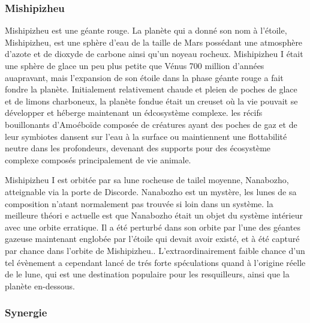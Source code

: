 \subsubsection{Mishipizheu} \label{sec:mishipizheu} 

Mishipizheu est une géante rouge. La planète qui a donné son nom à l'étoile, Mishipizheu, est une sphère d'eau de la taille de Mars possédant une atmosphère d'azote et de dioxyde de carbone ainsi qu'un noyeau rocheux. Mishipizheu I était une sphère de glace un peu plus petite que Vénus 700 million d'années auapravant, mais l'expansion de son étoile dans la phase géante rouge a fait fondre la planète. Initialement relativement chaude et pleien de poches de glace et de limons charboneux, la planète fondue était un creuset où la vie pouvait se développer et héberge maintenant un édcosystème complexe. les récifs bouillonants d'Amoéboïde composée de créatures ayant des poches de gaz et de leur symbiotes dansent sur l'eau à la surface ou maintiennent une flottabilité neutre dans les profondeurs, devenant des supports pour des écosystème complexe composés principalement de vie animale. 

Mishipizheu I est orbitée par sa lune rocheuse de tailel moyenne, Nanabozho, atteignable via la porte de Discorde. Nanabozho est un mystère, les lunes de sa composition n'atant normalement pas trouvée si loin dans un système. la meilleure théori e actuelle est que Nanabozho était un objet du système intérieur avec une orbite erratique. Il a été perturbé dans son orbite par l'une des géantes gazeuse maintenant englobée par l'étoile qui devait avoir existé, et à été capturé par chance dans l'orbite de Mishipizheu.. L'extraordinairement faible chance d'un tel évènement a cependant lancé de trés forte spéculations quand à l'origine réelle de le lune, qui est une destination populaire pour les resquilleurs, ainsi que la planète en-dessous. 

\subsubsection{Synergie} \label{sec:synergy} 

